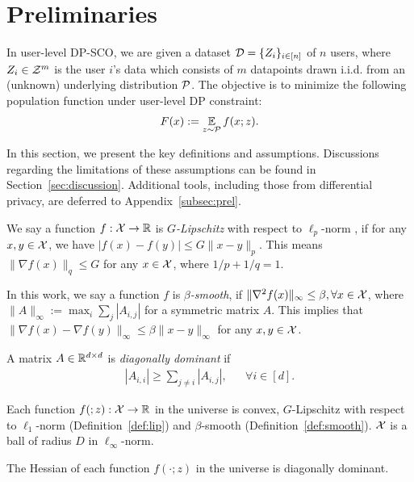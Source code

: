 \section{Preliminaries}
\label{sec:prel}
In user-level DP-SCO, we are given a dataset $\mathcal{D}=\{Z_i\}_{i\in[n]}$ of $n$ users, where $Z_i \in \mathcal{Z}^m$ is the user $i$'s data which consists of $m$ datapoints drawn i.i.d. from an (unknown) underlying distribution $\mathcal{P}$.
The objective is to minimize the following population function under user-level DP constraint:
\begin{align*}
    F(x):=\operatorname*{\mathbb{E}}_{z\sim \mathcal{P}}f(x;z).
\end{align*}

In this section, we present the key definitions and assumptions.  
Discussions regarding the limitations of these assumptions can be found in Section~\ref{sec:discussion}. Additional tools, including  
those from differential privacy, are deferred to Appendix~\ref{subsec:prel}.

\vspace{-2mm}
\begin{definition}[Lipschitz]
\label{def:lip}
    We say a function $f:\mathcal{X}\to\mathbb{R}$ is \emph{$G$-Lipschitz}  with respect to $\ell_p$-norm , if for any $x,y\in\mathcal{X}$, we have
    $
        |f(x)-f(y)|\le G\|x-y\|_p.$
    This means $\|\nabla f(x)\|_q\le G$ for any $x \in \mathcal{X}$,
    where $1/p+1/q=1$.
\end{definition}
\vspace{-5mm}
\begin{definition}[Smooth]
\label{def:smooth}
    In this work, we say a function $f$ is \emph{$\beta$-smooth}, if $\|\nabla^2 f(x)\|_\infty\le \beta,\forall x\in\mathcal{X}$, where $\|A\|_\infty:=\max_i\sum_{j}|A_{i,j}|$ for a symmetric matrix $A$.
    This implies that $\|\nabla f(x)-\nabla f(y)\|_\infty\le \beta \|x-y\|_\infty$ for any $x,y\in\mathcal{X}$.
\end{definition}
\vspace{-5mm}
\begin{definition}
    A matrix $A\in\mathbb{R}^{d\times d}$ is \emph{diagonally dominant} if 
    \begin{align*}
        |A_{i,i}|\ge \sum_{j\neq i}|A_{i,j}|,& &\forall i \in [d].
    \end{align*}
\end{definition}
\vspace{-5mm}
\begin{assumption}
\label{assum:lispchitz_smooth}
    Each function $f(;z):\mathcal{X}\to \mathbb{R}$ in the universe is convex, $G$-Lipschitz with respect to $\ell_1$-norm (Definition~\ref{def:lip}) and $\beta$-smooth (Definition~\ref{def:smooth}).
    $\mathcal{X}$ is a ball of radius $D$ in $\ell_\infty$-norm.
\end{assumption}
\vspace{-5mm}
\begin{assumption}
\label{assump:dia_dominant}
    The Hessian of each function $f(\cdot;z)$ in the universe is diagonally dominant.
\end{assumption}

